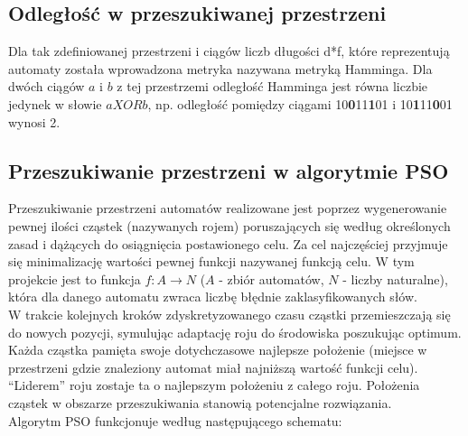\documentclass[runningheads,a4paper]{llncs}
\begin{document}
\subsection{Odległość w przeszukiwanej przestrzeni}

Dla tak zdefiniowanej przestrzeni i ciągów liczb długości d*f, które reprezentują automaty została wprowadzona metryka nazywana metryką Hamminga. Dla dwóch ciągów $a$ i $b$ z tej przestrzemi odległość Hamminga jest równa liczbie jedynek w słowie $a XOR b$, np. odległość pomiędzy ciągami 10\textbf{0}11\textbf{1}01 i 10\textbf{1}11\textbf{0}01 wynosi 2.

\subsection{Przeszukiwanie przestrzeni w algorytmie PSO}

Przeszukiwanie przestrzeni automatów realizowane jest poprzez wygenerowanie pewnej ilości cząstek (nazywanych rojem) poruszających się według określonych zasad i dążących do osiągnięcia postawionego celu. Za cel najczęściej przyjmuje się minimalizację wartości pewnej funkcji nazywanej funkcją celu. W tym projekcie jest to funkcja $f:A \rightarrow N$ ($A$ - zbiór automatów, $N$ - liczby naturalne), która dla danego automatu zwraca liczbę błędnie zaklasyfikowanych słów.\\

W trakcie kolejnych kroków zdyskretyzowanego czasu cząstki przemieszczają się do nowych pozycji, symulując adaptację roju do środowiska poszukując optimum. Każda cząstka pamięta swoje dotychczasowe najlepsze położenie (miejsce w przestrzeni gdzie znaleziony automat miał najniższą wartość funkcji celu). “Liderem” roju zostaje ta o najlepszym położeniu z całego roju. Położenia cząstek w obszarze przeszukiwania stanowią potencjalne rozwiązania. \\

Algorytm PSO funkcjonuje według następującego schematu:
\end{document}
